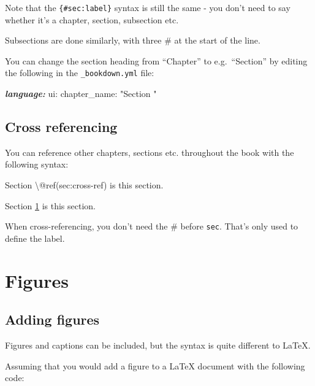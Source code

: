 \documentclass[
]{book}
\newenvironment{Shaded}{\begin{snugshade}}{\end{snugshade}}
\newcommand{\AnnotationTok}[1]{\textcolor[rgb]{0.56,0.35,0.01}{\textbf{\textit{#1}}}}
\newcommand{\NormalTok}[1]{#1}
\begin{document}
Note that the \texttt{\{\#sec:label\}} syntax is still the same - you don't need to say whether it's a chapter, section, subsection etc.

Subsections are done similarly, with three \# at the start of the line.

You can change the section heading from ``Chapter'' to e.g.~``Section'' by editing the following in the \texttt{\_bookdown.yml} file:

\begin{Shaded}
\begin{Highlighting}[]
\AnnotationTok{language:}
\NormalTok{  ui:}
\NormalTok{    chapter\_name: "Section "}
\end{Highlighting}
\end{Shaded}

\section{Cross referencing}\label{sec:cross-ref}

You can reference other chapters, sections etc. throughout the book with the following syntax:

\begin{Shaded}
\begin{Highlighting}[]
\NormalTok{Section \textbackslash{}@ref(sec:cross{-}ref) is this section.}
\end{Highlighting}
\end{Shaded}

Section \ref{sec:cross-ref} is this section.

When cross-referencing, you don't need the \# before \texttt{sec}. That's only used to define the label.

\chapter{Figures}\label{sec:figures}

\section{Adding figures}\label{sec:add-figs}

Figures and captions can be included, but the syntax is quite different to LaTeX.

Assuming that you would add a figure to a LaTeX document with the following code:
\end{document}
